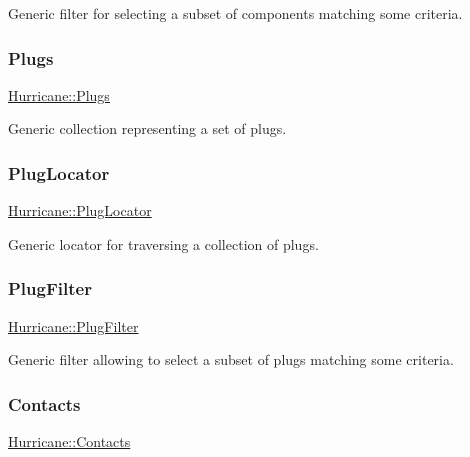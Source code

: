 Generic filter for selecting a subset of components matching some criteria. \mbox{\label{namespaceHurricane_ac8335d2057483ee7a935c15a9460c64f}} 
\subsubsection{\texorpdfstring{Plugs}{Plugs}}
{\footnotesize\ttfamily \mbox{\hyperlink{namespaceHurricane_ac8335d2057483ee7a935c15a9460c64f}{Hurricane\+::\+Plugs}}}

Generic collection representing a set of plugs. \mbox{\label{namespaceHurricane_a99a5e89f593de242e24a24b632b0534e}} 
\subsubsection{\texorpdfstring{Plug\+Locator}{PlugLocator}}
{\footnotesize\ttfamily \mbox{\hyperlink{namespaceHurricane_a99a5e89f593de242e24a24b632b0534e}{Hurricane\+::\+Plug\+Locator}}}

Generic locator for traversing a collection of plugs. \mbox{\label{namespaceHurricane_ad6b0bd4bdff4c52e6163b9f54e3e5c92}} 
\subsubsection{\texorpdfstring{Plug\+Filter}{PlugFilter}}
{\footnotesize\ttfamily \mbox{\hyperlink{namespaceHurricane_ad6b0bd4bdff4c52e6163b9f54e3e5c92}{Hurricane\+::\+Plug\+Filter}}}

Generic filter allowing to select a subset of plugs matching some criteria. \mbox{\label{namespaceHurricane_a1e6a8ab09f688509bd727b3fee02d0d2}} 
\subsubsection{\texorpdfstring{Contacts}{Contacts}}
{\footnotesize\ttfamily \mbox{\hyperlink{namespaceHurricane_a1e6a8ab09f688509bd727b3fee02d0d2}{Hurricane\+::\+Contacts}}}

